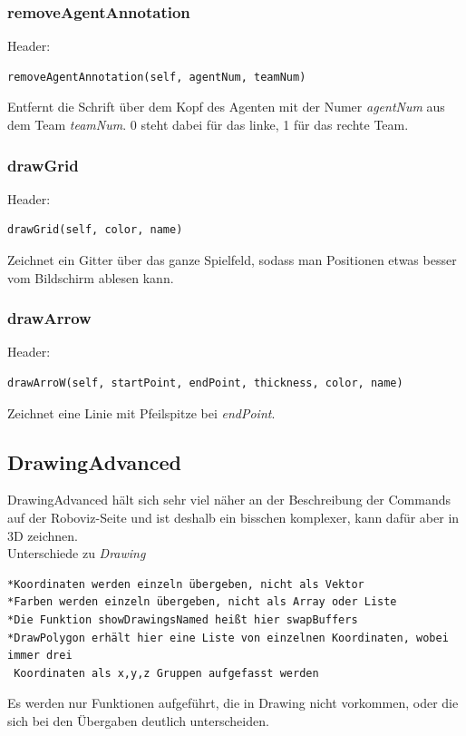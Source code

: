 \subsubsection{removeAgentAnnotation}
Header:

\begin{verbatim}removeAgentAnnotation(self, agentNum, teamNum)
\end{verbatim}
Entfernt die Schrift über dem Kopf des Agenten mit der Numer \textit{agentNum} aus dem Team \textit{teamNum}.
0 steht dabei für das linke, 1 für das rechte Team.

\subsubsection{drawGrid}
Header:

\begin{verbatim}drawGrid(self, color, name)
\end{verbatim}
Zeichnet ein Gitter über das ganze Spielfeld, sodass man Positionen etwas besser vom Bildschirm ablesen kann.

\subsubsection{drawArrow}
Header:

\begin{verbatim}drawArroW(self, startPoint, endPoint, thickness, color, name)
\end{verbatim}
Zeichnet eine Linie mit Pfeilspitze bei \textit{endPoint}.

\subsection{DrawingAdvanced}
DrawingAdvanced hält sich sehr viel näher an der Beschreibung der Commands auf der Roboviz-Seite und ist deshalb ein bisschen komplexer, kann dafür aber in 3D zeichnen.\\
Unterschiede zu \textit{Drawing}

\begin{verbatim}*Koordinaten werden einzeln übergeben, nicht als Vektor
*Farben werden einzeln übergeben, nicht als Array oder Liste
*Die Funktion showDrawingsNamed heißt hier swapBuffers
*DrawPolygon erhält hier eine Liste von einzelnen Koordinaten, wobei immer drei 
 Koordinaten als x,y,z Gruppen aufgefasst werden
\end{verbatim}
Es werden nur Funktionen aufgeführt, die in Drawing nicht vorkommen, oder die sich bei den Übergaben deutlich unterscheiden.

